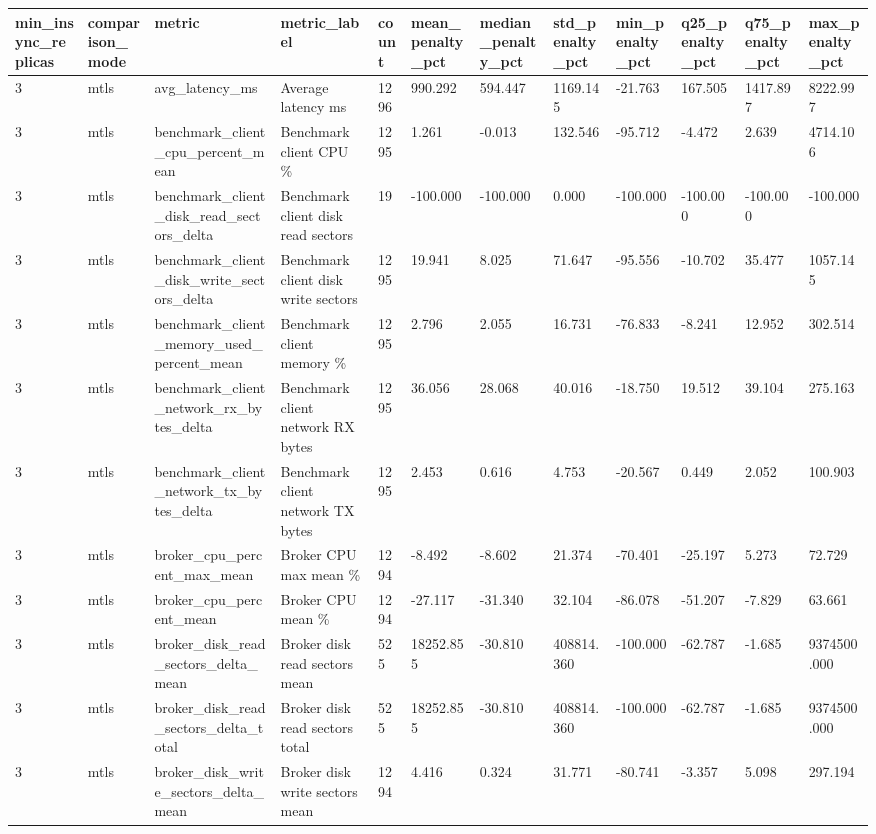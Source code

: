 \begin{longtable}{llllllllllll}
\hline
min\_insync\_replicas & comparison\_mode & metric & metric\_label & count & mean\_penalty\_pct & median\_penalty\_pct & std\_penalty\_pct & min\_penalty\_pct & q25\_penalty\_pct & q75\_penalty\_pct & max\_penalty\_pct \\
\hline
3 & mtls & avg\_latency\_ms & Average latency ms & 1296 & 990.292 & 594.447 & 1169.145 & -21.763 & 167.505 & 1417.897 & 8222.997 \\
3 & mtls & benchmark\_client\_cpu\_percent\_mean & Benchmark client CPU \% & 1295 & 1.261 & -0.013 & 132.546 & -95.712 & -4.472 & 2.639 & 4714.106 \\
3 & mtls & benchmark\_client\_disk\_read\_sectors\_delta & Benchmark client disk read sectors & 19 & -100.000 & -100.000 & 0.000 & -100.000 & -100.000 & -100.000 & -100.000 \\
3 & mtls & benchmark\_client\_disk\_write\_sectors\_delta & Benchmark client disk write sectors & 1295 & 19.941 & 8.025 & 71.647 & -95.556 & -10.702 & 35.477 & 1057.145 \\
3 & mtls & benchmark\_client\_memory\_used\_percent\_mean & Benchmark client memory \% & 1295 & 2.796 & 2.055 & 16.731 & -76.833 & -8.241 & 12.952 & 302.514 \\
3 & mtls & benchmark\_client\_network\_rx\_bytes\_delta & Benchmark client network RX bytes & 1295 & 36.056 & 28.068 & 40.016 & -18.750 & 19.512 & 39.104 & 275.163 \\
3 & mtls & benchmark\_client\_network\_tx\_bytes\_delta & Benchmark client network TX bytes & 1295 & 2.453 & 0.616 & 4.753 & -20.567 & 0.449 & 2.052 & 100.903 \\
3 & mtls & broker\_cpu\_percent\_max\_mean & Broker CPU max mean \% & 1294 & -8.492 & -8.602 & 21.374 & -70.401 & -25.197 & 5.273 & 72.729 \\
3 & mtls & broker\_cpu\_percent\_mean & Broker CPU mean \% & 1294 & -27.117 & -31.340 & 32.104 & -86.078 & -51.207 & -7.829 & 63.661 \\
3 & mtls & broker\_disk\_read\_sectors\_delta\_mean & Broker disk read sectors mean & 525 & 18252.855 & -30.810 & 408814.360 & -100.000 & -62.787 & -1.685 & 9374500.000 \\
3 & mtls & broker\_disk\_read\_sectors\_delta\_total & Broker disk read sectors total & 525 & 18252.855 & -30.810 & 408814.360 & -100.000 & -62.787 & -1.685 & 9374500.000 \\
3 & mtls & broker\_disk\_write\_sectors\_delta\_mean & Broker disk write sectors mean & 1294 & 4.416 & 0.324 & 31.771 & -80.741 & -3.357 & 5.098 & 297.194 \\

\end{longtable}
